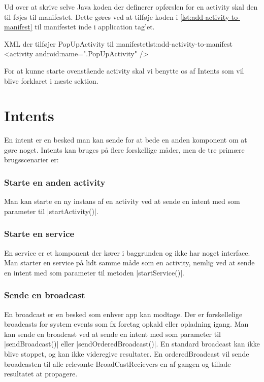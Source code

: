 Ud over at skrive selve Java koden der definerer opførslen for en activity skal den til føjes til manifestet. Dette gøres ved at tilføje koden i \autoref{lst:add-activity-to-manifest} til manifestet inde i application tag'et.

\begin{XmlCode}{XML der tilføjer PopUpActivity til manifestet}{lst:add-activity-to-manifest}
	<activity android:name=".PopUpActivity" />
\end{XmlCode}

For at kunne starte ovenstående activity skal vi benytte os af Intents som vil blive forklaret i næste sektion.


\section{Intents}

En intent er en besked man kan sende for at bede en anden komponent om at gøre noget. Intents kan bruges på flere forskellige måder, men de tre primære brugsscenarier er:

\subsubsection{Starte en anden activity}

Man kan starte en ny instans af en activity ved at sende en intent med som parameter til \JavaInline|startActivity()|. 

\subsubsection{Starte en service}

En service er et komponent der kører i baggrunden og ikke har noget interface. Man starter en service på lidt samme måde som en activity, nemlig ved at sende en intent med som parameter til metoden \JavaInline|startService()|.

\subsubsection{Sende en broadcast}

En broadcast er en besked som enhver app kan modtage. Der er forskellelige broadcasts for system events som fx foretag opkald eller opladning igang. Man kan sende en broadcast ved at sende en intent med som parameter til \JavaInline|sendBroadcast()| eller \JavaInline|sendOrderedBroadcast()|.
En standard broadcast kan ikke blive stoppet, og kan ikke videregive resultater. En orderedBroadcast vil sende broadcasten til alle relevante BroadCastRecievers en af gangen og tillade resultatet at propagere.

